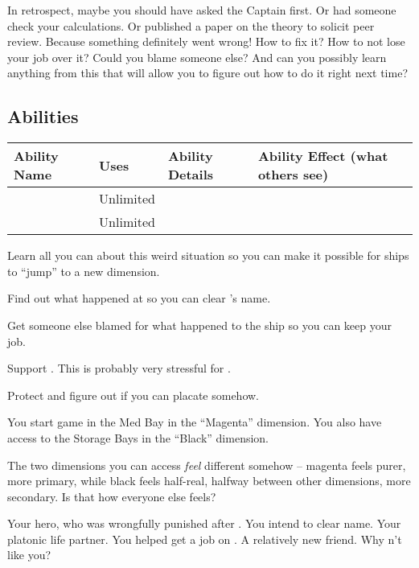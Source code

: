 \documentclass[char]{TMFHope}
\begin{document}
In retrospect, maybe you should have asked the Captain first. Or had someone check your calculations. Or published a paper on the theory to solicit peer review. Because something definitely went wrong! How to fix it? How to not lose your job over it? Could you blame someone else? And can you possibly learn anything from this that will allow you to figure out how to do it right next time?

\subsection*{Abilities}
\begin{tabular}{|p{3cm}|p{1.5cm}|p{8.5cm}|p{3cm}|} 
 \hline
 \textbf{Ability Name} & \textbf{Uses} & \textbf{Ability Details} & \textbf{Ability Effect (what others see)} \\ 
\hline 
 \aCalculate{\MYname} & Unlimited & \aCalculate{\MYtext} & \aCalculate{\MYeffect} \\ 
\hline 
\aInvestigation{\MYname} & Unlimited & \aInvestigation{\MYtext} & \aInvestigation{\MYeffect}\\ 
 \hline
\end{tabular}

\begin{itemz}[Goals]
	\item Learn all you can about this weird situation so you can make it possible for ships to ``jump'' to a new dimension.
	\item Find out what happened at \pBattle{} so you can clear \cCap{}'s name.
	\item Get someone else blamed for what happened to the ship so you can keep your job.
	\item Support \cWeap{}. This is probably very stressful for \cWeap{\them}.
	\item Protect \cBoy{} and figure out if you can placate \cEng{} somehow.
\end{itemz}

\begin{itemz}[Notes]
	\item You start game in the Med Bay in the ``Magenta'' dimension. You also have access to the Storage Bays in the ``Black'' dimension.
	\item The two dimensions you can access {\em feel} different somehow -- magenta feels purer, more primary, while black feels half-real, halfway between other dimensions, more secondary.  Is that how everyone else feels?
\end{itemz}

\begin{contacts}
	\contact{\cCap{}} Your hero, who was wrongfully punished after \pBattle{}. You intend to clear \cCap{\their} name.
	\contact{\cBoy{}} Your platonic life partner. You helped get \cBoy{\them} a job on \pNew{}.
	\contact{\cWeap{}} A relatively new friend.
	\contact{\cEng{}} Why \cEng{\does}n't \cEng{\they} like you?
\end{contacts}
\end{document}
